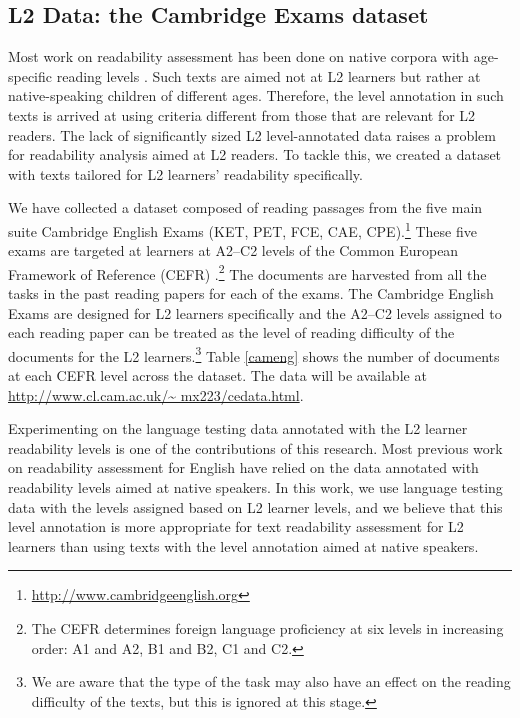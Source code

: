 \documentclass[11pt,letterpaper]{article}
\begin{document}
		
	
\subsection{L2 Data: the Cambridge Exams dataset}
    Most work on readability assessment has been done on native corpora with age-specific reading levels \cite{schwarm2005reading,feng2010comparison}. Such texts are aimed not at L2 learners but rather at native-speaking children of different ages. Therefore, the level annotation in such texts is arrived at using criteria different from those that are relevant for L2 readers. The lack of significantly sized L2 level-annotated data raises a problem for readability analysis aimed at L2 readers. To tackle this, we created a dataset with texts tailored for L2 learners' readability specifically. 
     
    We have collected a dataset composed of reading passages from the five main suite Cambridge English Exams (KET, PET, FCE, CAE, CPE).\footnote{\url{http://www.cambridgeenglish.org}} These five exams are targeted at learners at A2--C2 levels of the Common European Framework of Reference (CEFR) \cite{cefr2001common}.\footnote{The CEFR determines foreign language proficiency at six levels in increasing order: A1 and A2, B1 and B2, C1 and C2.}  The documents are harvested from all the tasks in the past reading papers for each of the exams. The Cambridge English Exams are designed for L2 learners specifically and the A2--C2 levels assigned to each reading paper can be treated as the level of reading difficulty of the documents for the L2 learners.\footnote{We are aware that the type of the task may also have an effect on the reading difficulty of the texts, but this is ignored at this stage.} Table \ref{cameng} shows the number of documents at each CEFR level across the dataset. The data will be available at \url{http://www.cl.cam.ac.uk/~ mx223/cedata.html}.
    
      Experimenting on the language testing data annotated with the L2 learner readability levels is one of the contributions of this research. Most previous work on readability assessment for English have relied on the data annotated with readability levels aimed at native speakers. In this work, we use language testing data with the levels assigned based on L2 learner levels, and we believe that this level annotation is more appropriate for text readability assessment for L2 learners than using texts with the level annotation aimed at native speakers.
    
\end{document}
